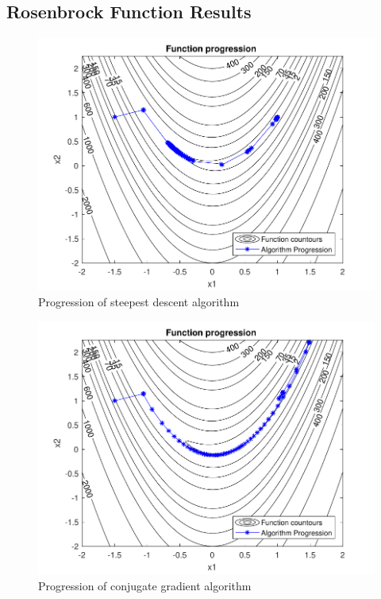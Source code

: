 \documentclass{article}
\newcommand{\wide}{0.7\linewidth}
\begin{document}
\subsection{Rosenbrock Function Results}
\begin{figure}[H]
  \centering
  \includegraphics[width=\wide]{progression1.pdf}
  \caption{Progression of steepest descent algorithm}
  \label{fig:steepest1}
\end{figure}

\begin{figure}[H]
	\centering
	\includegraphics[width=\wide]{progression2.pdf}
	\caption{Progression of conjugate gradient algorithm}
	\label{fig:steepes2}
\end{figure}
\end{document}
